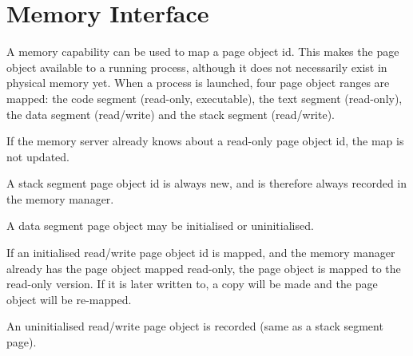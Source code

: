 \section{Memory Interface}

A memory capability can be used to map a page object id.  This makes the page object available to a running process, although it does not necessarily exist in physical memory yet.  When a process is launched, four page object ranges are mapped: the code segment (read-only, executable), the text segment (read-only), the data segment (read/write) and the stack segment (read/write).

If the memory server already knows about a read-only page object id, the map is not updated.

A stack segment page object id is always new, and is therefore always recorded in the memory manager.

A data segment page object may be initialised or uninitialised.

If an initialised read/write page object id is mapped, and the memory manager already has the page object mapped read-only, the page object is mapped to the read-only version.  If it is later written to, a copy will be made and the page object will be re-mapped.

An uninitialised read/write page object is recorded (same as a stack segment page).
